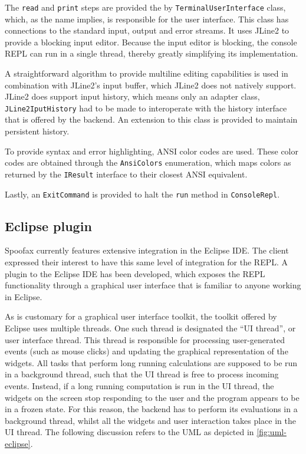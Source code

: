 The \texttt{read} and \texttt{print} steps are provided
the by \texttt{TerminalUserInterface} class, which, as the name implies, is
responsible for the user interface. This class has connections to the standard
input, output and error streams. It uses JLine2 to provide a blocking input
editor. Because the input editor is blocking, the console REPL can run in a
single thread, thereby greatly simplifying its implementation.

A straightforward algorithm to provide multiline editing capabilities is used in
combination with JLine2's input buffer, which JLine2 does not natively support.
JLine2 does support input history, which means only an adapter class,
\texttt{JLine2IputHistory} had to be made to interoperate with the history
interface that is offered by the backend. An extension to this class is provided
to maintain persistent history.

To provide syntax and error highlighting, ANSI color codes are used. These
color codes are obtained through the \texttt{AnsiColors} enumeration, which
maps colors as returned by the \texttt{IResult} interface to their closest
ANSI equivalent.

Lastly, an \texttt{ExitCommand} is provided to halt the \texttt{run} method
in \texttt{ConsoleRepl}.

\subsection{Eclipse plugin}
\label{ssec:eclipse-plugin}

Spoofax currently features extensive integration in the Eclipse IDE. The client
expressed their interest to have this same level of integration for the REPL. A
plugin to the Eclipse IDE has been developed, which exposes the REPL
functionality through a graphical user interface that is familiar to anyone
working in Eclipse.

As is customary for a graphical user interface toolkit, the toolkit offered by
Eclipse uses multiple threads. One such thread is designated the ``UI thread'',
or user interface thread. This thread is responsible for processing
user-generated events (such as mouse clicks) and updating the graphical
representation of the widgets. All tasks that perform long running
calculations are supposed to be run in a background thread, such that the UI
thread is free to process incoming events. Instead, if a long running
computation is run in the UI thread, the widgets on the screen stop responding
to the user and the program appears to be in a frozen state. For this reason,
the backend has to perform its evaluations in a background thread, whilst all
the widgets and user interaction takes place in the UI thread.
The following discussion refers to the UML as depicted in
\cref{fig:uml-eclipse}.

